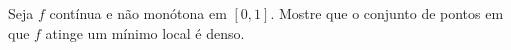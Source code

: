 Seja \(f\) contínua e não monótona em \([0,1]\). Mostre que o conjunto de pontos em que \(f\) atinge um mínimo local é denso.
